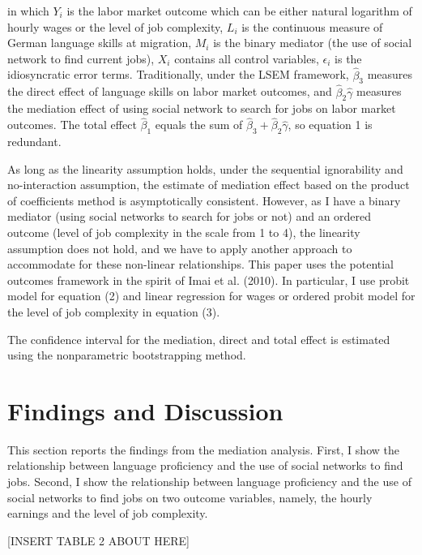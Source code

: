 \documentclass[12pt,a4paper]{article}
\begin{document}
in which $Y_{i}$ is the labor market outcome which can be either natural logarithm of hourly wages or the level of job complexity, $L_{i}$ is the continuous measure of German language skills at migration, $M_{i}$ is the binary mediator (the use of social network to find current jobs), $X_{i}$ contains all control variables, $\epsilon_{i}$ is the idiosyncratic error terms. Traditionally, under the LSEM framework, $\hat \beta_{3}$ measures the direct effect of language skills on labor market outcomes, and $\hat \beta_{2}\hat \gamma$ measures the mediation effect of using social network to search for jobs on labor market outcomes. The total effect $\hat \beta_{1}$ equals the sum of $\hat \beta_{3} + \hat \beta_{2}\hat \gamma$, so equation 1 is redundant. 

As long as the linearity assumption holds, under the sequential ignorability and no-interaction assumption, the estimate of mediation effect based on the product of coefficients method is asymptotically consistent. However, as I have a binary mediator (using social networks to search for jobs or not) and an ordered outcome (level of job complexity in the scale from 1 to 4), the linearity assumption does not hold, and we have to apply another approach to accommodate for these non-linear relationships. This paper uses the potential outcomes framework in the spirit of Imai et al. (2010). In particular, I use probit model for equation (2) and linear regression for wages or ordered probit model for the level of job complexity in equation (3).

The confidence interval for the mediation, direct and total effect is estimated using the nonparametric bootstrapping method.

\section{Findings and Discussion}
This section reports the findings from the mediation analysis. First, I show the relationship between language proficiency and the use of social networks to find jobs. Second, I show the relationship between language proficiency and the use of social networks to find jobs on two outcome variables, namely, the hourly earnings and the level of job complexity.

\begin{center}
[INSERT TABLE 2 ABOUT HERE]
\end{center}
\end{document}
